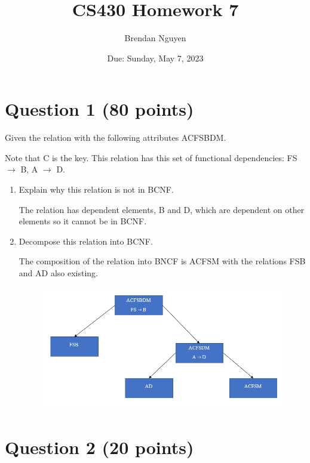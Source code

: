 \documentclass[letterpaper, 11pt]{article}
\title{CS430 Homework 7}
\author{Brendan Nguyen}
\date{Due: Sunday, May 7, 2023}
\begin{document}
\maketitle

\section*{Question 1 (80 points)}

Given the relation with the following attributes ACFSBDM.

Note that C is the key. This relation has this set of functional dependencies: FS $\to$ B, A $\to$ D.

\begin{enumerate}[label={\alph*}),leftmargin=*]
    \item Explain why this relation is not in BCNF.

    The relation has dependent elements, B and D, which are dependent on other elements so it cannot be in BCNF.
    
    \item Decompose this relation into BCNF.

    The composition of the relation into BNCF is ACFSM with the relations FSB and AD also existing.
    \begin{figure}[H]
        \centering
        \includegraphics[scale=0.7]{hw7-1b.png}
    \end{figure}
\end{enumerate}

\section*{Question 2 (20 points)}
\end{document}
